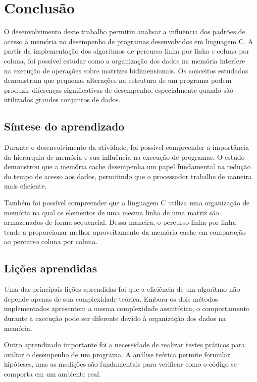 \chapter{Conclusão}
\label{cap:conclusao}

O desenvolvimento deste trabalho permitiu analisar a influência dos padrões de acesso à memória no desempenho de programas desenvolvidos em linguagem C. A partir da implementação dos algoritmos de percurso linha por linha e coluna por coluna, foi possível estudar como a organização dos dados na memória interfere na execução de operações sobre matrizes bidimensionais. Os conceitos estudados demonstram que pequenas alterações na estrutura de um programa podem produzir diferenças significativas de desempenho, especialmente quando são utilizados grandes conjuntos de dados.

\section{Síntese do aprendizado}
Durante o desenvolvimento da atividade, foi possível compreender a importância da hierarquia de memória e sua influência na execução de programas. O estudo demonstrou que a memória cache desempenha um papel fundamental na redução do tempo de acesso aos dados, permitindo que o processador trabalhe de maneira mais eficiente.

Também foi possível compreender que a linguagem C utiliza uma organização de memória na qual os elementos de uma mesma linha de uma matriz são armazenados de forma sequencial. Dessa maneira, o percurso linha por linha tende a proporcionar melhor aproveitamento da memória cache em comparação ao percurso coluna por coluna.

\section{Lições aprendidas}
Uma das principais lições aprendidas foi que a eficiência de um algoritmo não depende apenas de sua complexidade teórica. Embora os dois métodos implementados apresentem a mesma complexidade assintótica, o comportamento durante a execução pode ser diferente devido à organização dos dados na memória.

Outro aprendizado importante foi a necessidade de realizar testes práticos para avaliar o desempenho de um programa. A análise teórica permite formular hipóteses, mas as medições são fundamentais para verificar como o código se comporta em um ambiente real.

